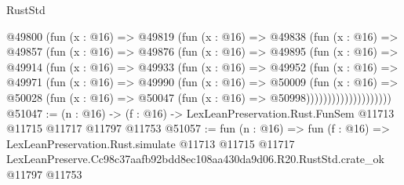 \begin{lexlean}{RustStd}
\begin{coremodule}
              @49800
                (fun (x : @16) =>
                @49819
                  (fun (x : @16) =>
                  @49838
                    (fun (x : @16) =>
                    @49857
                      (fun (x : @16) =>
                      @49876
                        (fun (x : @16) =>
                        @49895
                          (fun (x : @16) =>
                          @49914
                            (fun (x : @16) =>
                            @49933
                              (fun (x : @16) =>
                              @49952
                                (fun (x : @16) =>
                                @49971
                                  (fun (x : @16) =>
                                  @49990
                                    (fun (x : @16) =>
                                    @50009
                                      (fun (x : @16) =>
                                      @50028
                                        (fun (x : @16) =>
                                        @50047 (fun (x : @16) => @50998))))))))))))))))))))
@51047 := (n : @16) ->
  (f : @16) -> LexLeanPreservation.Rust.FunSem @11713 @11715 @11717 @11797 @11753
@51057 := fun (n : @16) =>
  fun (f : @16) =>
  LexLeanPreservation.Rust.simulate
    @11713
    @11715
    @11717
    LexLeanPreserve.Cc98c37aafb92bdd8ec108aa430da9d06.R20.RustStd.crate_ok
    @11797
    @11753
\end{coremodule}
\end{lexlean}
